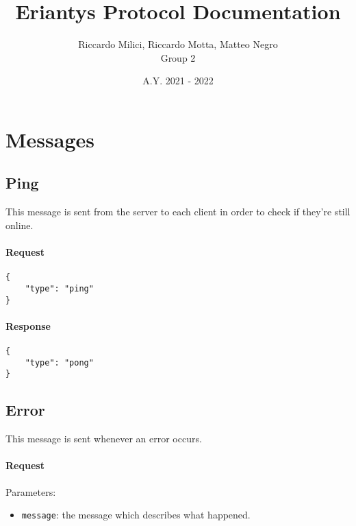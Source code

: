 \documentclass[a4paper]{article}
\title{\textbf{Eriantys Protocol Documentation}}
\author{Riccardo Milici, Riccardo Motta, Matteo Negro\\Group 2}
\date{A.Y. 2021 - 2022}
\begin{document}
	\maketitle

	\section{Messages}

	\subsection{Ping}

	This message is sent from the server to each client in order to check if they're still online.
	
	\begin{multicols}{2}
		
		\paragraph{Request}
		
		\begin{verbatim}
{
	"type": "ping"
}
		\end{verbatim}
	
		\paragraph{Response}
		
		\begin{verbatim}
{
	"type": "pong"
}
		\end{verbatim}
	
	\end{multicols}

	\subsection{Error}
	
	This message is sent whenever an error occurs.
	
	\paragraph{Request} Parameters:
	
	\begin{itemize}
		\item \verb|message|: the message which describes what happened.
	\end{itemize}
	
\end{document}
